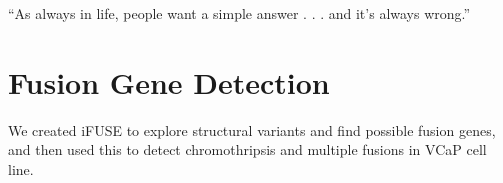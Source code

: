 \begin{savequote}[75mm]
“As always in life, people want a simple answer . . . and it’s always wrong.”
\end{savequote}

\chapter{Fusion Gene Detection}
\label{chapter:fusiongenes}
\setcounter{figure}{-1}
\setcounter{table}{-1}
\setcounter{section}{-1}

We created iFUSE to explore structural variants and find possible fusion genes, and then used this to detect chromothripsis and multiple fusions in VCaP cell line.


